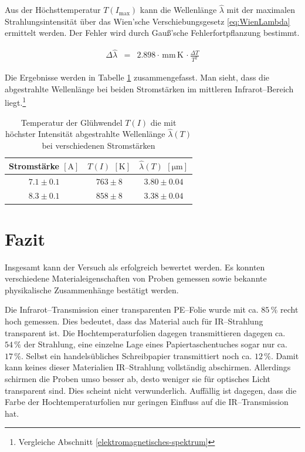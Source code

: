 \documentclass[12pt,a4paper]{scrartcl}
\numberwithin{equation}{section} %
\begin{document}
Aus der Höchsttemperatur $T(I_\mathrm{max})$ kann die Wellenlänge $\hat \lambda$ mit der maximalen Strahlungsintensität über das Wien'sche Verschiebungsgesetz \eqref{eq:WienLambda} ermittelt werden. Der Fehler wird durch Gauß'sche Fehlerfortpflanzung bestimmt.

\begin{eqnarray}
	\Delta \hat  \lambda &= & 2.898 \cdot \mathrm{\,mm\,K\,}\cdot \frac{\Delta T}{{T^2}}
\end{eqnarray}

\noindent
Die Ergebnisse werden in Tabelle \ref{tab:Höchsttemperatur} zusammengefasst. Man sieht, dass die abgestrahlte Wellenlänge bei beiden Stromstärken im mittleren Infrarot--Bereich liegt.\footnote{Vergleiche Abschnitt \ref{elektromagnetisches-spektrum}}

\begin{table}[h!]
	\centering
	\begin{tabular}{c|c|c}
		Stromstärke $[\mathrm{A}]$ & $T(I)$ $[\mathrm{K}]$ & $\hat \lambda(T)$ $[\mathrm{\mu m}]$ \\
		\hline
		$7.1 \pm 0.1$ & $763 \pm 8$ & $ 3.80 \pm 0.04$  \\
		$8.3 \pm 0.1$ & $858 \pm 8$ & $ 3.38 \pm 0.04$  \\
	\end{tabular}
	\caption{Temperatur der Glühwendel $T(I)$ die mit höchster Intensität abgestrahlte Wellenlänge $\hat\lambda(T)$ bei verschiedenen Stromstärken}
	\label{tab:Höchsttemperatur}
\end{table}

\clearpage
\hypertarget{fazit}{%
\section{Fazit}\label{fazit}}
Insgesamt kann der Versuch als erfolgreich bewertet werden. Es konnten verschiedene Materialeigenschaften von Proben gemessen sowie bekannte physikalische Zusammenhänge bestätigt werden.

Die Infrarot--Transmission einer transparenten PE--Folie wurde mit ca. $85\,\%$ recht hoch gemessen. Dies bedeutet, dass das Material auch für IR--Strahlung transparent ist. Die Hochtemperaturfolien dagegen transmittieren dagegen ca. $54\,\%$ der Strahlung, eine einzelne Lage eines Papiertaschentuches sogar nur ca. $17\,\%$. Selbst ein handelsübliches Schreibpapier transmittiert noch ca. $12\,\%$. Damit kann keines dieser Materialien IR--Strahlung vollständig abschirmen. Allerdings schirmen die Proben umso besser ab, desto weniger sie für optisches Licht transparent sind. Dies scheint nicht verwunderlich. Auffällig ist dagegen, dass die Farbe der Hochtemperaturfolien nur geringen Einfluss auf die IR--Transmission hat.
\end{document}
